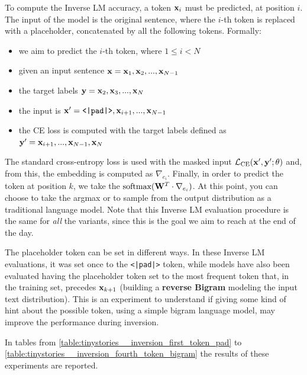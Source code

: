 \documentclass[../thesis.tex]{subfiles}
\begin{document}
To compute the Inverse LM accuracy, a token $\mathbf{x}_i$ must be predicted, at position $i$.
The input of the model is the original sentence, where the $i$-th token is replaced with a placeholder, concatenated by all the following tokens.
Formally:
\begin{itemize}
    \item we aim to predict the $i$-th token, where $1 \leq i < N$
    \item given an input sentence $\mathbf{x} = \mathbf{x}_1, \mathbf{x}_2, ..., \mathbf{x}_{N-1}$
    \item the target labels $\mathbf{y} = \mathbf{x}_2, \mathbf{x}_3, ..., \mathbf{x}_N$
    \item the input is $\bx' = \texttt{<|pad|>}, \bx_{i+1}, ..., \bx_{N-1}$
    \item the CE loss is computed with the target labels defined as $\mathbf{y}' = \mathbf{x}_{i+1}, ..., \mathbf{x}_{N-1}, \mathbf{x}_N$
\end{itemize}
The standard cross-entropy loss is used with the masked input $\mathcal{L}_\text{CE}(\mathbf{x}', \mathbf{y}'; \theta)$ and, from this, the embedding is computed as $\nabla_{e_i}$.
Finally, in order to predict the token at position $k$, we take the $\text{softmax}(\mathbf{W}^T \cdot \nabla_{e_i})$. At this point, you can choose to take the argmax or to sample from the output distribution as a traditional language model.
Note that this Inverse LM evaluation procedure is the same for \emph{all} the variants, since this is the goal we aim to reach at the end of the day.

The placeholder token can be set in different ways. In these Inverse LM evaluations, it was set once to the \texttt{<|pad|>} token, while models have also been evaluated having the placeholder token set to the most frequent token that, in the training set, precedes $\mathbf{x}_{k+1}$ (building a \textbf{reverse Bigram} modeling the input text distribution). This is an experiment to understand if giving some kind of hint about the possible token, using a simple bigram language model, may improve the performance during inversion.

In tables from \ref{table:tinystories__inversion_first_token_pad} to \ref{table:tinystories__inversion_fourth_token_bigram} the results of these experiments are reported.
\end{document}
